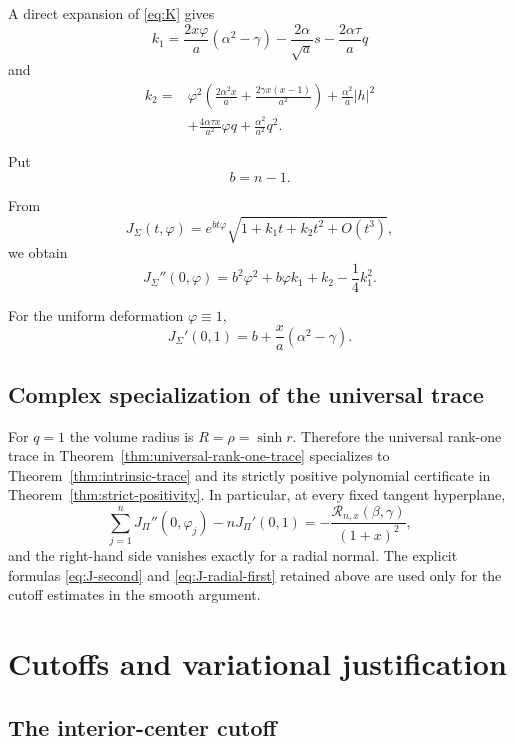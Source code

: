\documentclass[11pt,reqno]{amsart}
\numberwithin{equation}{section}
\theoremstyle{definition}
\theoremstyle{remark}
\begin{document}
A direct expansion of \eqref{eq:K} gives
\[
k_1
=
\frac{2x\varphi}{a}(\alpha^2-\gamma)
-
\frac{2\alpha}{\sqrt a}s
-
\frac{2\alpha\tau}{a}q
\]
and
\[
\begin{aligned}
k_2
={}&
\varphi^2
\left(
\frac{2\alpha^2x}{a}
+
\frac{2\gamma x(x-1)}{a^2}
\right)
+
\frac{\alpha^2}{a}|h|^2
\\
&+
\frac{4\alpha\tau x}{a^2}\varphi q
+
\frac{\alpha^2}{a^2}q^2.
\end{aligned}
\]

Put
\[
b=n-1.
\]

From
\[
J_\Sigma(t,\varphi)
=
e^{bt\varphi}
\sqrt{
1+k_1t+k_2t^2+O(t^3)
},
\]
we obtain
\begin{equation}
J_\Sigma''(0,\varphi)
=
b^2\varphi^2
+
b\varphi k_1
+
k_2
-
\frac{1}{4}k_1^2.
\label{eq:J-second}
\end{equation}

For the uniform deformation \(\varphi\equiv1\),
\begin{equation}
J_\Sigma'(0,1)
=
b+\frac{x}{a}(\alpha^2-\gamma).
\label{eq:J-radial-first}
\end{equation}

\subsection{Complex specialization of the universal trace}

For $q=1$ the volume radius is $R=\rho=\sinh r$.  Therefore the universal
rank-one trace in Theorem~\ref{thm:universal-rank-one-trace} specializes to
Theorem~\ref{thm:intrinsic-trace} and its strictly positive polynomial
certificate in Theorem~\ref{thm:strict-positivity}.  In particular, at every
fixed tangent hyperplane,
\[
 \sum_{j=1}^nJ_\Pi''(0,\varphi_j)-nJ_\Pi'(0,1)
 =-\frac{\mathcal R_{n,x}(\beta,\gamma)}{(1+x)^2},
\]
and the right-hand side vanishes exactly for a radial normal.  The explicit
formulas \eqref{eq:J-second} and \eqref{eq:J-radial-first} retained above are
used only for the cutoff estimates in the smooth argument.

\section{Cutoffs and variational justification}\label{sec:cutoff-variational}
\subsection{The interior-center cutoff}\label{sec:interior-cutoff}
\end{document}
